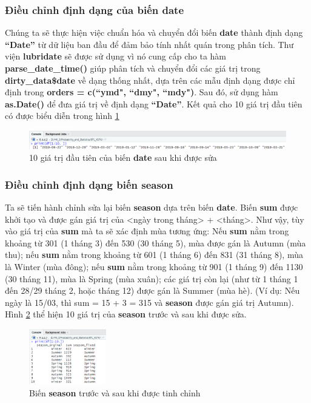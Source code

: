 \subsubsection{Điều chỉnh định dạng của biến date}
Chúng ta sẽ thực hiện việc chuẩn hóa và chuyển đổi biến \textbf{date} thành định dạng \textbf{``Date''} từ dữ liệu ban đầu để đảm bảo tính nhất quán trong phân tích. Thư viện \textbf{lubridate} sẽ được sử dụng vì nó cung cấp cho ta hàm \textbf{parse\_date\_time()} giúp phân tích và chuyển đổi các giá trị trong \textbf{dirty\_data\$date} về dạng thống nhất, dựa trên các mẫu định dạng được chỉ định trong \textbf{orders = c(``ymd", ``dmy", ``mdy")}. Sau đó, sử dụng hàm \textbf{as.Date()} để đưa giá trị về định dạng \textbf{``Date''}. Kết quả cho 10 giá trị đầu tiên có được biểu diễn trong hình \ref{f2}
\begin{figure}[!htbp]
    \centering
    \includegraphics[width=\textwidth]{graphics/Pre_processing_data/f2.PNG}
    \caption{10 giá trị đầu tiên của biến \textbf{date} sau khi được sửa}
    \label{f2}
\end{figure} 
\subsubsection{Điều chỉnh định dạng biến season}
Ta sẽ tiến hành chỉnh sửa lại biến \textbf{season} dựa trên biến \textbf{date}. Biến \textbf{sum} được khởi tạo và được gán giá trị của <ngày trong tháng> + <tháng>. Như vậy, tùy vào giá trị của \textbf{sum} mà ta sẽ xác định mùa tương ứng: Nếu \textbf{sum} nằm trong khoảng từ 301 (1 tháng 3) đến 530 (30 tháng 5), mùa được gán là Autumn (mùa thu); nếu \textbf{sum} nằm trong khoảng từ 601 (1 tháng 6) đến 831 (31 tháng 8), mùa là Winter (mùa đông); nếu \textbf{sum} nằm trong khoảng từ 901 (1 tháng 9) đến 1130 (30 tháng 11), mùa là Spring (mùa xuân); các giá trị còn lại (như từ 1 tháng 1 đến 28/29 tháng 2, hoặc tháng 12) được gán là Summer (mùa hè). (Ví dụ: Nếu ngày là 15/03, thì sum = 15 + 3  = 315 và \textbf{season} được gán giá trị Autumn). Hình \ref{f3} thể hiện 10 giá trị của \textbf{season} trước và sau khi được sửa.
\begin{figure}[!htbp]
    \centering
    \includegraphics[width=0.3\textwidth]{graphics/Pre_processing_data/f3.PNG}
    \caption{Biến \textbf{season} trước và sau khi được tinh chỉnh}
    \label{f3}
\end{figure}


